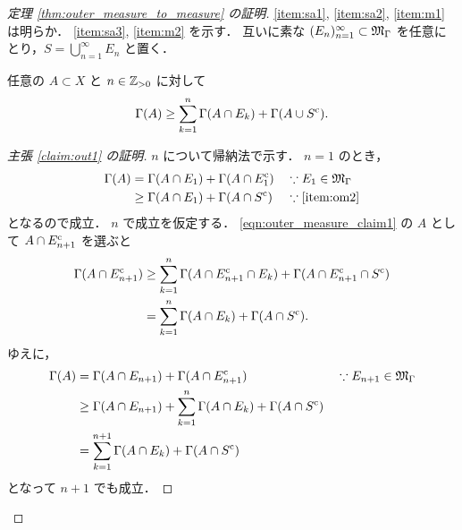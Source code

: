 \begin{proof}[定理 \ref{thm:outer_measure_to_measure} の証明]
    \ref{item:sa1}, \ref{item:sa2}, \ref{item:m1} は明らか．
    \ref{item:sa3}, \ref{item:m2} を示す．
    互いに素な $(E_n)_{n=1}^\infty\subset\mathfrak{M}_\Gamma$ を任意にとり，$S=\bigcup_{n=1}^\infty E_n$ と置く．

    \begin{claim}\label{claim:out1}
        任意の $A\subset X$ と $n\in\mathbb{Z}_{>0}$ に対して
        \begin{align}
            \Gamma(A)\ge\sum_{k=1}^n\Gamma(A\cap E_k)+\Gamma(A\cup S^{\mathrm{c}}).
            \label{eqn:outer_measure_claim1}
        \end{align}
    \end{claim}

    \begin{proof}[主張 \ref{claim:out1} の証明]
        $n$ について帰納法で示す．
        $n=1$ のとき，
        \begin{align*}
            \Gamma(A)
            &=\Gamma(A\cap E_1)+\Gamma(A\cap E_1^{\mathrm{c}})&&\because E_1\in\mathfrak{M}_\Gamma\\
            &\ge\Gamma(A\cap E_1)+\Gamma(A\cap S^{\mathrm{c}})&&\because\text{\ref{item:om2}}
        \end{align*}
        となるので成立．
        $n$ で成立を仮定する．
        \eqref{eqn:outer_measure_claim1} の $A$ として $A\cap E_{n+1}^{\mathrm{c}}$ を選ぶと
        \begin{align*}
            \Gamma(A\cap E_{n+1}^{\mathrm{c}})
            &\ge\sum_{k=1}^n\Gamma(A\cap E_{n+1}^{\mathrm{c}}\cap E_k)+\Gamma(A\cap E_{n+1}^{\mathrm{c}}\cap S^{\mathrm{c}})\\
            &=\sum_{k=1}^n\Gamma(A\cap E_k)+\Gamma(A\cap S^{\mathrm{c}}).
        \end{align*}
        ゆえに，
        \begin{align*}
            \Gamma(A)
            &=\Gamma(A\cap E_{n+1})+\Gamma(A\cap E_{n+1}^{\mathrm{c}})&&\because E_{n+1}\in\mathfrak{M}_\Gamma\\
            &\ge\Gamma(A\cap E_{n+1})+\sum_{k=1}^n\Gamma(A\cap E_k)+\Gamma(A\cap S^{\mathrm{c}})\\
            &=\sum_{k=1}^{n+1}\Gamma(A\cap E_k)+\Gamma(A\cap S^{\mathrm{c}})
        \end{align*}
        となって $n+1$ でも成立．
    \end{proof}


\end{proof}
